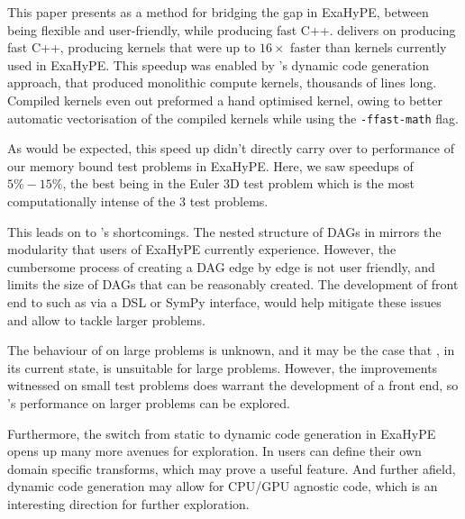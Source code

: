 This paper presents \phlat as a method for bridging the gap in ExaHyPE, between being flexible and user-friendly, while producing fast C++.
\phlat delivers on producing fast C++, producing kernels that were up to $16\times$ faster than kernels currently used in ExaHyPE.
This speedup was enabled by \phlat{}'s dynamic code generation approach, that produced monolithic compute kernels, thousands of lines long.
Compiled kernels even out preformed a hand optimised kernel, owing to better automatic vectorisation of the compiled kernels while using the \texttt{-ffast-math} flag.

As would be expected, this speed up didn't directly carry over to performance of our memory bound test problems in ExaHyPE.
Here, we saw speedups of $5\% - 15\%$, the best being in the Euler 3D test problem which is the most computationally intense of the 3 test problems.

This leads on to \phlat{}'s shortcomings.
The nested structure of DAGs in \phlat mirrors the modularity that users of ExaHyPE currently experience.
However, the cumbersome process of creating a DAG edge by edge is not user friendly, and limits the size of DAGs that can be reasonably created.
The development of front end to \phlat such as via a DSL or SymPy interface, would help mitigate these issues and allow \phlat to tackle larger problems.

The behaviour of \phlat on large problems is unknown, and it may be the case that \phlat, in its current state, is unsuitable for large problems.
However, the improvements witnessed on small test problems does warrant the development of a front end, so \phlat{}'s performance on larger problems can be explored.

Furthermore, the switch from static to dynamic code generation in ExaHyPE opens up many more avenues for exploration.
In \phlat users can define their own domain specific transforms, which may prove a useful feature.
And further afield, dynamic code generation may allow for CPU/GPU agnostic code, which is an interesting direction for further exploration.

